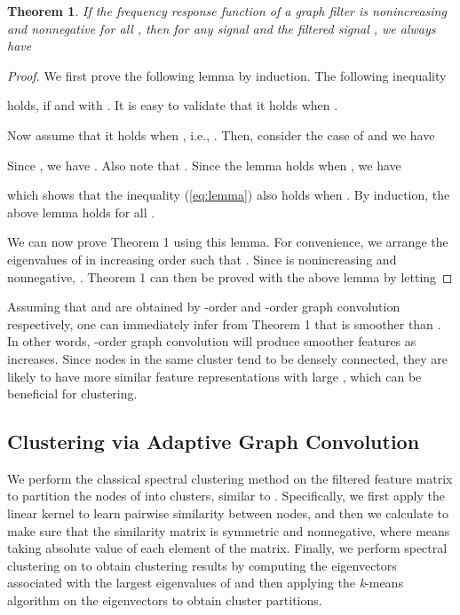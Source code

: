 \documentclass{article}
\newtheorem{theorem}{Theorem}
\begin{document}
\begin{theorem}
    If the frequency response function  of a graph filter  is nonincreasing and nonnegative for all , then for any signal  and the filtered signal , we always have
    
\end{theorem}
\begin{proof}
    We first prove the following lemma by induction.
    The following inequality
    
    holds, if  and  with . It is easy to validate that it holds when .

    Now assume that it holds when , i.e., . Then, consider the case of  and we have
    
    Since , we have . Also note that . Since the lemma holds when , we have
    
    which shows that the inequality (\ref{eq:lemma}) also holds when . By induction, the above lemma holds for all .

    We can now prove Theorem 1 using this lemma. For convenience, we arrange the eigenvalues  of  in increasing order such that . Since  is nonincreasing and nonnegative,  . Theorem 1 can then be proved with the above lemma by letting
    
\end{proof}

Assuming that  and  are obtained by -order and -order graph convolution respectively, one can immediately infer from Theorem 1 that  is smoother than . In other words, -order graph convolution will produce smoother features as  increases. Since nodes in the same cluster tend to be densely connected, they are likely to have more similar feature representations with large , which can be beneficial for clustering.


\subsection{Clustering via Adaptive Graph Convolution}

We perform the classical spectral clustering method \cite{perona1998,von2007tutorial} on the filtered feature matrix  to partition the nodes of  into  clusters, similar to \cite{wang2017mgae}. Specifically, we first apply the linear kernel  to learn pairwise similarity between nodes, and then we calculate  to make sure that the similarity matrix is symmetric and nonnegative, where  means taking absolute value of each element of the matrix. Finally, we perform spectral clustering on  to obtain clustering results by computing the eigenvectors associated with the  largest eigenvalues of  and then applying the \emph{k}-means algorithm on the eigenvectors to obtain cluster partitions.
\end{document}
